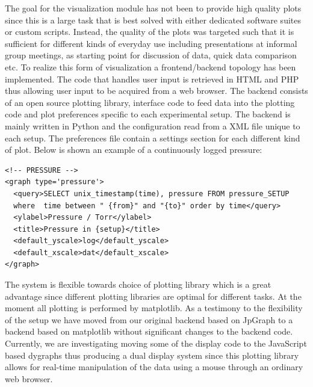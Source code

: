 The goal for the visualization module has not been to provide high quality
plots since this is a large task that is best solved with either dedicated
software suites or custom scripts. Instead, the quality of the plots was
targeted such that it is sufficient for different kinds of everyday use
including presentations at informal group meetings, as starting point for
discussion of data, quick data comparison etc. To realize this form of
visualization a frontend/backend topology has been implemented. The code that
handles user input is retrieved in HTML and PHP thus allowing user input to be
acquired from a web browser. The backend consists of an open source plotting
library, interface code to feed data into the plotting code and plot
preferences specific to each experimental setup. The backend is mainly written
in Python and the configuration read from a XML file unique to each setup. The
preferences file contain a settings section for each different kind of plot.
Below is shown an example of a continuously logged pressure:

\begin{verbatim} 
<!-- PRESSURE --> 
<graph type='pressure'>
  <query>SELECT unix_timestamp(time), pressure FROM pressure_SETUP
  where  time between " {from}" and "{to}" order by time</query>
  <ylabel>Pressure / Torr</ylabel>
  <title>Pressure in {setup}</title>
  <default_yscale>log</default_yscale>
  <default_xscale>dat</default_xscale>
</graph>
\end{verbatim}

The system is flexible towards choice of plotting library which is a great
advantage since different plotting libraries are optimal for different tasks.
At the moment all plotting is performed by matplotlib\cite{matplotlib}.  As a
testimony to the flexibility of the setup we have moved from our original
backend based on JpGraph\cite{jpgraph} to a backend based on matplotlib without
significant changes to the backend code. Currently, we are investigating moving
some of the display code to the JavaScript based dygraphs\cite{dygraphs} thus
producing a dual display system since this plotting library allows for real-time 
manipulation of the data using a mouse through an ordinary web browser.
